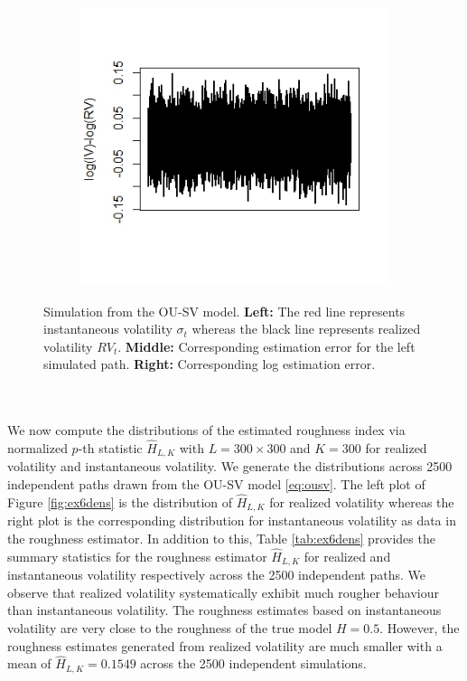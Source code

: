 \documentclass{article}
\begin{document}
\begin{figure}[h]
\begin{subfigure}{0.32\textwidth}
    \end{subfigure}\hfill
    \begin{subfigure}{0.32\textwidth}
        \centering
        \includegraphics[width=\textwidth]{ex6_IVRV3.jpeg}
    \end{subfigure}
    \caption{Simulation from the OU-SV model. \textbf{Left:} The red line represents instantaneous volatility $\sigma_t$ whereas the black line represents realized volatility $RV_t$. \textbf{Middle:} Corresponding estimation error for the left simulated path. \textbf{Right:} Corresponding log estimation error.}
    \label{fig:example}
\end{figure}\\\\
We now compute the distributions of the estimated roughness index via normalized $p$-th statistic $\hat{H}_{L,K}$ with $L=300\times 300$ and $K=300$ for realized volatility and instantaneous volatility. We generate the distributions across 2500 independent paths drawn from the OU-SV model \eqref{eq:ousv}. The left plot of Figure \ref{fig:ex6dens} is the distribution of $\hat{H}_{L,K}$ for realized volatility whereas the right plot is the corresponding distribution for instantaneous volatility as data in the roughness estimator. In addition to this, Table \ref{tab:ex6dens} provides the summary statistics for the roughness estimator $\hat{H}_{L,K}$ for realized and instantaneous volatility respectively across the 2500 independent paths. We observe that realized volatility systematically exhibit much rougher behaviour than instantaneous volatility. The roughness estimates based on instantaneous volatility are very close to the roughness of the true model $H=0.5$. However, the roughness estimates generated from realized volatility are much smaller with a mean of $\hat{H}_{L,K}=0.1549$ across the 2500 independent simulations.
\end{document}
